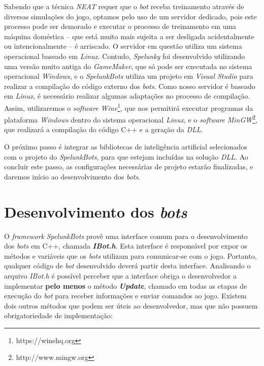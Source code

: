 Sabendo que a técnica \textit{NEAT} requer que o \textit{bot} receba treinamento
através de diversas simulações do jogo, optamos pelo uso de um servidor
dedicado, pois este processo pode ser demorado e executar o processo de
treinamento em uma máquina doméstica -- que está muito mais sujeita a ser
desligada acidentalmente ou intencionalmente -- é arriscado. O servidor em
questão utiliza um sistema operacional baseado em \textit{Linux}.  Contudo,
\textit{Spelunky} foi desenvolvido utilizando uma versão muito antiga do
\textit{GameMaker}, que só pode ser executada no sistema operacional
\textit{Windows}, e o \textit{SpelunkBots} utiliza um projeto em \textit{Visual
Studio} para realizar a compilação do código externo dos \textit{bots}. Como
nosso servidor é baseado em \textit{Linux}, é necessário realizar algumas
adaptações no processo de compilação. Assim, utilizaremos o \textit{software}
\textit{Wine}\footnote{https://winehq.org}, que nos permitirá executar programas
da plataforma \textit{Windows} dentro do sistema operacional \textit{Linux}, e o
\textit{software} \textit{MinGW}\footnote{http://www.mingw.org}, que realizará a
compilação do código C++ e a geração da \textit{DLL}.

O próximo passo é integrar as bibliotecas de inteligência artificial
selecionados com o projeto do \textit{SpelunkBots}, para que estejam incluídas
na solução \textit{DLL}. Ao concluir este passo, as configurações necessárias de
projeto estarão finalizadas, e daremos início ao desenvolvimento dos
\textit{bots}.


\section{Desenvolvimento dos \textit{bots}}
O \textit{framework} \textit{SpelunkBots} provê uma interface comum para o
desenvolvimento dos \textit{bots} em C++, chamada \textbf{\textit{IBot.h}}. Esta
interface é responsável por expor os métodos e variáveis que os \textit{bots}
utilizam para comunicar-se com o jogo. Portanto, qualquer código de \textit{bot}
desenvolvido deverá partir desta interface. Analisando o arquivo \textit{IBot.h}
é possível perceber que a interface obriga o desenvolvedor a implementar
\textbf{pelo menos} o método \textbf{\textit{Update}}, chamado em todas as
etapas de execução do \textit{bot} para receber informações e enviar comandos ao
jogo. Existem dois outros métodos que podem ser úteis ao desenvolvedor, mas que
não possuem obrigatoriedade de implementação:

